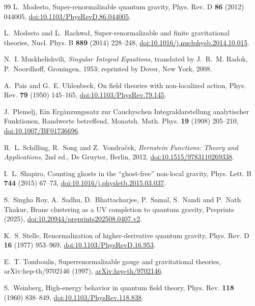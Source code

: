 \documentclass[aps,prd,twocolumn,superscriptaddress,nofootinbib,longbibliography,floatfix,amsmath,amssymb,10pt]{revtex4-2}
\theoremstyle{definition}
\theoremstyle{remark}
\begin{document}
\begin{thebibliography}{99}
L.~Modesto, Super-renormalizable quantum gravity, Phys. Rev. D \textbf{86}
(2012) 044005,
\href{https://doi.org/10.1103/PhysRevD.86.044005}{doi:10.1103/PhysRevD.86.044005}.

L.~Modesto and L.~Rachwa{\l}, Super-renormalizable and finite gravitational
theories, Nucl. Phys. B \textbf{889} (2014) 228--248,
\href{https://doi.org/10.1016/j.nuclphysb.2014.10.015}{doi:10.1016/j.nuclphysb.2014.10.015}.

N.~I. Muskhelishvili, \emph{Singular Integral Equations}, translated by
J.~R.~M. Radok, P.~Noordhoff, Groningen, 1953; reprinted by Dover, New York,
2008.

A.~Pais and G.~E. Uhlenbeck, On field theories with non-localized action,
Phys. Rev. \textbf{79} (1950) 145--165,
\href{https://doi.org/10.1103/PhysRev.79.145}{doi:10.1103/PhysRev.79.145}.

J.~Plemelj, Ein Erg\"anzungssatz zur Cauchyschen Integraldarstellung
analytischer Funktionen, Randwerte betreffend, Monatsh. Math. Phys.
\textbf{19} (1908) 205--210,
\href{https://doi.org/10.1007/BF01736696}{doi:10.1007/BF01736696}.

R.~L. Schilling, R.~Song and Z.~Vondra\v{c}ek, \emph{Bernstein Functions:
Theory and Applications}, 2nd ed., De Gruyter, Berlin, 2012,
\href{https://doi.org/10.1515/9783110269338}{doi:10.1515/9783110269338}.

I.~L. Shapiro, Counting ghosts in the ``ghost-free'' non-local gravity,
Phys. Lett. B \textbf{744} (2015) 67--73,
\href{https://doi.org/10.1016/j.physletb.2015.03.037}{doi:10.1016/j.physletb.2015.03.037}.

S.~Singha Roy, A.~Sadhu, D.~Bhattacharjee, P.~Samal, S.~Nandi and
P.~Nath Thakur, Brane clustering as a UV completion to quantum gravity,
Preprints (2025),
\href{https://doi.org/10.20944/preprints202508.0407.v2}{doi:10.20944/preprints202508.0407.v2}.

K.~S. Stelle, Renormalization of higher-derivative quantum gravity, Phys.
Rev. D \textbf{16} (1977) 953--969,
\href{https://doi.org/10.1103/PhysRevD.16.953}{doi:10.1103/PhysRevD.16.953}.

E.~T. Tomboulis, Superrenormalizable gauge and gravitational theories,
arXiv:hep-th/9702146 (1997),
\href{https://arxiv.org/abs/hep-th/9702146}{arXiv:hep-th/9702146}.

S.~Weinberg, High-energy behavior in quantum field theory, Phys. Rev.
\textbf{118} (1960) 838--849,
\href{https://doi.org/10.1103/PhysRev.118.838}{doi:10.1103/PhysRev.118.838}.

\end{thebibliography}
\end{document}
